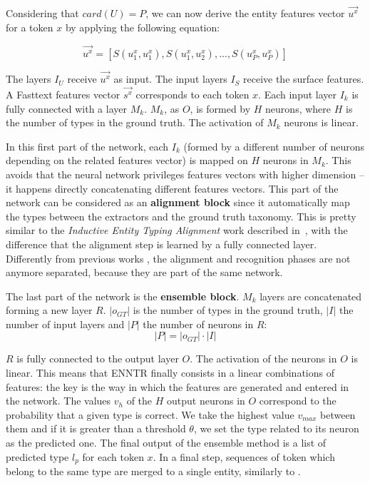 \documentclass{llncs}
\begin{document}
Considering that $card(U)=P$, we can now derive the entity features vector $\vec{u^{x}}$ for a token $x$ by applying the following equation: 

$$ \vec{u^{x}} = [S(u^{x}_{1},u^{x}_{1}),S(u^{x}_{1},u^{x}_{2}),...,S(u^{x}_{P},u^{x}_{P})] $$

The layers $I_U$ receive $\vec{u^{x}}$ as input. The input layers $I_S$ receive the surface features. A Fasttext features vector $\vec{s^{x}}$ corresponds to each token $x$. Each input layer $I_k$ is fully connected with a layer $M_k$. $M_k$, as $O$, is formed by $H$ neurons, where $H$ is the number of types in the ground truth. The activation of $M_k$ neurons is linear.

In this first part of the network, each $I_k$ (formed by a different number of neurons depending on the related features vector) is mapped on $H$ neurons in $M_k$. This avoids that the neural network privileges features vectors with higher dimension -- it happens directly concatenating different features vectors. This part of the network can be considered as an \textbf{alignment block} since it automatically map the types between the extractors and the ground truth taxonomy. This is pretty similar to the \textit{Inductive Entity Typing Alignment} work described in~\cite{nerd4}, with the difference that the alignment step is learned by a fully connected layer. Differently from previous works \cite{fox1,fox2}, the alignment and recognition phases are not anymore separated, because they are part of the same network. 

The last part of the network is the \textbf{ensemble block}. $M_k$ layers are concatenated forming a new layer $R$. $\left\vert{o_{GT}}\right\vert$ is the number of types in the ground truth, $\left\vert{I}\right\vert$ the number of input layers and $\left\vert{P}\right\vert$ the number of neurons in $R$:
 $$\left\vert{P}\right\vert =  \left\vert{o_{GT}}\right\vert \cdot \left\vert{I}\right\vert$$
 
$R$ is fully connected to the output layer $O$. The activation of the neurons in $O$ is linear. This means that ENNTR finally consists in a linear combinations of features: the key is the way in which the features are generated and entered in the network. The values $v_h$ of the $H$ output neurons in $O$ correspond to the probability that a given type is correct. We take the highest value $v_{max}$ between them and if it is greater than a threshold $\theta$, we set the type related to its neuron as the predicted one. The final output of the ensemble method is a list of predicted type $l_{p}$ for each token $x$. In a final step, sequences of token which belong to the same type are merged to a single entity, similarly to \cite{fox1,fox2}.
\end{document}

